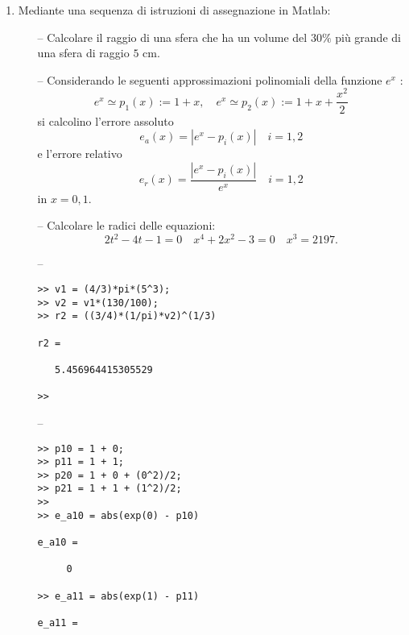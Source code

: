 \begin{enumerate}

\item Mediante una sequenza di istruzioni di assegnazione in Matlab:
\begin{itemize}
\item[--]
Calcolare il raggio di una sfera che ha un volume del $30\%$ più grande di 
una sfera di raggio $5$ cm.
\item[--]
Considerando le seguenti approssimazioni polinomiali della funzione $e^x$ :
\[
e^x \simeq p_1(x) := 1 + x, \quad
e^x \simeq p_2(x) := 1 + x +\frac{x^2}{2}\]
si calcolino l’errore assoluto
\[e_a (x) = |e^x − p_i (x)| \quad i = 1, 2\]
e l’errore relativo
\[e_r(x) = \frac{|e^x − p_i(x)|}{e^x} \quad i = 1, 2\]
in $x = 0,1$.
\item[--] Calcolare le radici delle equazioni:
\[2t^2 − 4t − 1 = 0 \quad
x^4 + 2x^2 − 3 = 0 \quad
x^3 = 2197.\]
\end{itemize}

\begin{svol}
\begin{itemize}
\item[--]
\begin{codice}
\begin{verbatim}
>> v1 = (4/3)*pi*(5^3);
>> v2 = v1*(130/100);
>> r2 = ((3/4)*(1/pi)*v2)^(1/3)

r2 =

   5.456964415305529

>> 
\end{verbatim}
\end{codice}
\item[--]
\begin{codice}
\begin{verbatim}
>> p10 = 1 + 0;
>> p11 = 1 + 1;
>> p20 = 1 + 0 + (0^2)/2;
>> p21 = 1 + 1 + (1^2)/2;
>> 
>> e_a10 = abs(exp(0) - p10)

e_a10 =

     0

>> e_a11 = abs(exp(1) - p11)

e_a11 =


\end{verbatim}
\end{codice}
\end{itemize}
\end{svol}
\end{enumerate}

